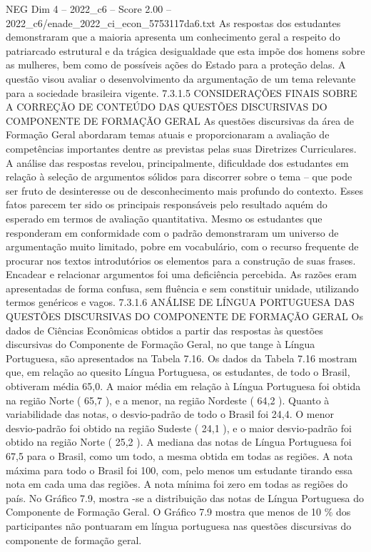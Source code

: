 \begin{textsample}{NEG Dim 4 – 2022\_c6 – Score 2.00 – 2022\_c6/enade\_2022\_ci\_econ\_5753117da6.txt}
As respostas dos estudantes demonstraram que a maioria apresenta um conhecimento geral a respeito do patriarcado estrutural e da trágica desigualdade que esta impõe dos homens sobre as mulheres, bem como de possíveis ações do Estado para a proteção delas.
A questão visou avaliar o desenvolvimento da argumentação de um tema relevante para a sociedade brasileira vigente. 7.3.1.5 CONSIDERAÇÕES FINAIS SOBRE A CORREÇÃO DE CONTEÚDO DAS QUESTÕES DISCURSIVAS DO COMPONENTE DE FORMAÇÃO GERAL As questões discursivas da área de Formação Geral abordaram temas atuais e proporcionaram a avaliação de competências importantes dentre as previstas pelas suas Diretrizes Curriculares.
A análise das respostas revelou, principalmente, dificuldade dos estudantes em relação à seleção de argumentos sólidos para discorrer sobre o tema – que pode ser fruto de desinteresse ou de desconhecimento mais profundo do contexto.
Esses fatos parecem ter sido os principais responsáveis pelo resultado aquém do esperado em termos de avaliação quantitativa.
Mesmo os estudantes que responderam em conformidade com o padrão demonstraram um universo de argumentação muito limitado, pobre em vocabulário, com o recurso frequente de procurar nos textos introdutórios os elementos para a construção de suas frases.
Encadear e relacionar argumentos foi uma deficiência percebida.
As razões eram apresentadas de forma confusa, sem fluência e sem constituir unidade, utilizando termos genéricos e vagos. 7.3.1.6 ANÁLISE DE LÍNGUA PORTUGUESA DAS QUESTÕES DISCURSIVAS DO COMPONENTE DE FORMAÇÃO GERAL Os dados de Ciências Econômicas obtidos a partir das respostas às questões discursivas do Componente de Formação Geral, no que tange à Língua Portuguesa, são apresentados na Tabela 7.16.
Os dados da Tabela 7.16 mostram que, em relação ao quesito Língua Portuguesa, os estudantes, de todo o Brasil, obtiveram média 65,0.
A maior média em relação à Língua Portuguesa foi obtida na região Norte ( 65,7 ), e a menor, na região Nordeste ( 64,2 ).
Quanto à variabilidade das notas, o desvio-padrão de todo o Brasil foi 24,4.
O menor desvio-padrão foi obtido na região Sudeste ( 24,1 ), e o maior desvio-padrão foi obtido na região Norte ( 25,2 ).
A mediana das notas de Língua Portuguesa foi 67,5 para o Brasil, como um todo, a mesma obtida em todas as regiões.
A nota máxima para todo o Brasil foi 100, com, pelo menos um estudante tirando essa nota em cada uma das regiões.
A nota mínima foi zero em todas as regiões do país.
No Gráfico 7.9, mostra -se a distribuição das notas de Língua Portuguesa do Componente de Formação Geral.
O Gráfico 7.9 mostra que menos de 10 \% dos participantes não pontuaram em língua portuguesa nas questões discursivas do componente de formação geral.

\end{textsample}
